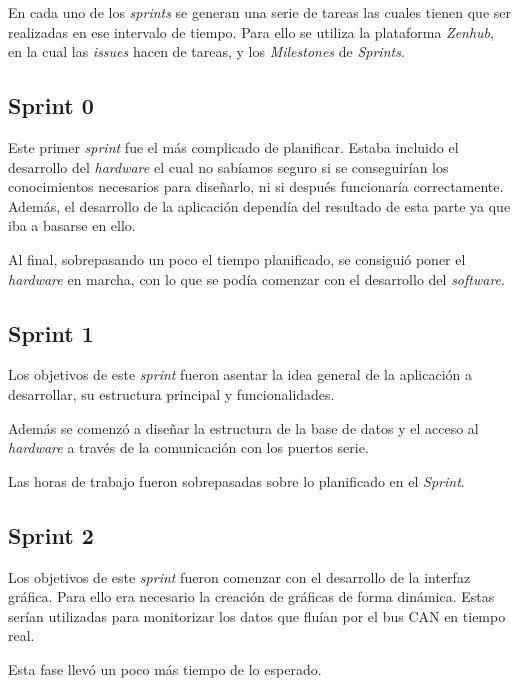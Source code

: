 En cada uno de los \emph{sprints} se generan una serie de tareas las cuales tienen que ser realizadas en ese intervalo de tiempo. Para ello se utiliza la plataforma \emph{Zenhub}, en la cual las \emph{issues} hacen de tareas, y los \emph{Milestones} de \emph{Sprints}.

\subsection{Sprint 0}

Este primer \emph{sprint} fue el más complicado de planificar. Estaba incluido el desarrollo del \emph{hardware} el cual no sabíamos seguro si se conseguirían los conocimientos necesarios para diseñarlo, ni si después funcionaría correctamente. Además, el desarrollo de la aplicación dependía del resultado de esta parte ya que iba a basarse en ello.

Al final, sobrepasando un poco el tiempo planificado, se consiguió poner el \emph{hardware} en marcha, con lo que se podía comenzar con el desarrollo del \emph{software}.


\subsection{Sprint 1}

Los objetivos de este \emph{sprint} fueron asentar la idea general de la aplicación a desarrollar, su estructura principal y funcionalidades.

Además se comenzó a diseñar la estructura de la base de datos y el acceso al \emph{hardware} a través de la comunicación con los puertos serie.

Las horas de trabajo fueron sobrepasadas sobre lo planificado en el \emph{Sprint}.


\subsection{Sprint 2}

Los objetivos de este \emph{sprint} fueron comenzar con el desarrollo de la interfaz gráfica. Para ello era necesario la creación de gráficas de forma dinámica. Estas serían utilizadas para monitorizar los datos que fluían por el bus CAN en tiempo real.

Esta fase llevó un poco más tiempo de lo esperado.


